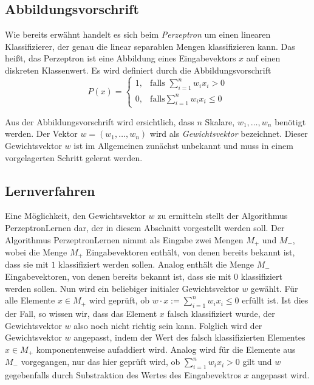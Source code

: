 \documentclass[fontsize=11pt]{scrartcl}
\begin{document}
            \subsection{Abbildungsvorschrift}
                Wie bereits erwähnt handelt es sich beim \emph{Perzeptron} um einen linearen Klassifizierer, der genau die linear separablen Mengen klassifizieren kann. Das heißt, das Perzeptron ist eine Abbildung eines Eingabevektors $x$ auf einen diskreten Klassenwert. Es wird definiert durch die Abbildungsvorschrift
                $$
                    P(x)=\left\{\begin{array}{cl} 1, & \mbox{falls }\sum_{i=1}^nw_ix_i > 0\\ 0, & \mbox{falls} \sum_{i=1}^n w_ix_i \leq 0 \end{array}\right. 
                $$ \cite{ertel2016}

                Aus der Abbildungsvorschrift wird ersichtlich, dass $n$ Skalare, $w_1,\dots,w_n$ benötigt werden. Der Vektor $w = (w_1,\dots, w_n)$ wird als \emph{Gewichtsvektor} bezeichnet. Dieser Gewichtsvektor $w$ ist im Allgemeinen zunächst unbekannt und muss in einem vorgelagerten Schritt gelernt werden.
            \subsection{Lernverfahren}
                Eine Möglichkeit, den Gewichtsvektor $w$ zu ermitteln stellt der Algorithmus PerzeptronLernen dar, der in diesem Abschnitt vorgestellt werden soll. Der Algorithmus PerzeptronLernen nimmt als Eingabe zwei Mengen $M_+$ und $M_-$, wobei die Menge $M_+$ Eingabevektoren enthält, von denen bereits bekannt ist, dass sie mit $1$ klassifiziert werden sollen. Analog enthält die Menge $M_-$ Eingabevektoren, von denen bereits bekannt ist, dass sie mit $0$ klassifiziert werden sollen.
                \newline
                Nun wird ein beliebiger initialer Gewichtsvektor $w$ gewählt.
                \newline
                Für alle Elemente $x \in M_+$ wird geprüft, ob $w \cdot x := \sum_{i=1}^nw_ix_i \leq 0$ erfüllt ist. Ist dies der Fall, so wissen wir, dass das Element $x$ falsch klassifiziert wurde, der Gewichtsvektor $w$ also noch nicht richtig sein kann. Folglich wird der Gewichtsvektor $w$ angepasst, indem der Wert des falsch klassifizierten Elementes $x \in M_+$ komponentenweise aufaddiert wird.
                \newline
                Analog wird für die Elemente aus $M_-$ vorgegangen, nur das hier geprüft wird, ob $\sum_{i=1}^nw_ix_i > 0$ gilt und $w$ gegebenfalls durch Substraktion des Wertes des Eingabevektros $x$ angepasst wird.
\end{document}

